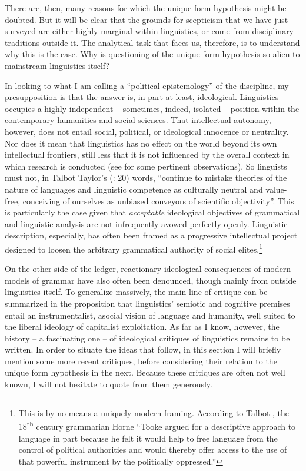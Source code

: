 \documentclass[output=paper]{langscibook}
\begin{document}
There are, then, many reasons for which the unique form hypothesis might be doubted. But it will be clear that the grounds for scepticism that we have just surveyed are either highly marginal within linguistics, or come from disciplinary traditions outside it. The analytical task that faces us, therefore, is to understand why this is the case. Why is questioning of the unique form hypothesis so alien to mainstream linguistics itself?

In looking to what I am calling a ``political epistemology'' of the discipline, my presupposition is that the answer is, in part at least, ideological. Linguistics occupies a highly independent – sometimes, indeed, isolated – position within the contemporary humanities and social sciences. That intellectual autonomy, however, does not entail social, political, or ideological innocence or neutrality. Nor does it mean that linguistics has no effect on the world beyond its own intellectual frontiers, still less that it is not influenced by the overall context in which research is conducted (see \citealt[182]{Joseph2002} for some pertinent observations). So linguists must not, in Talbot Taylor's (\citeyear{Taylor1990}: 20) words, ``continue to mistake theories of the nature of languages and linguistic competence as culturally neutral and value-free, conceiving of ourselves as unbiased conveyors of scientific objectivity''. This is particularly the case given that \emph{acceptable} ideological objectives of grammatical and linguistic analysis are not infrequently avowed perfectly openly. Linguistic description, especially, has often been framed as a progressive intellectual project designed to loosen the arbitrary grammatical authority of social elites.\footnote{This is by no means a uniquely modern framing. According to Talbot \citet[11]{Taylor1990}, the 18\textsuperscript{th} century grammarian Horne ``Tooke argued for a descriptive approach to language in part because he felt it would help to free language from the control of political authorities and would thereby offer access to the use of that powerful instrument by the politically oppressed.''}

On the other side of the ledger, reactionary ideological consequences of modern models of grammar have also often been denounced, though mainly from outside linguistics itself. To generalize massively, the main line of critique can be summarized in the proposition that linguistics' semiotic and cognitive premises entail an instrumentalist, asocial vision of language and humanity, well suited to the liberal ideology of capitalist exploitation. As far as I know, however, the history – a fascinating one – of ideological critiques of linguistics remains to be written. In order to situate the ideas that follow, in this section I will briefly mention some more recent critiques, before considering their relation to the unique form hypothesis in the next. Because these critiques are often not well known, I will not hesitate to quote from them generously.
\end{document}
